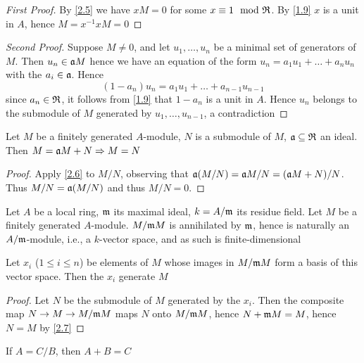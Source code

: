 \documentclass[11pt]{article}
\begin{document}
\begin{proof}[First Proof]
By \ref{2.5} we have \(xM=0\) for some \(x\equiv 1\mod{\mathfrak{R}}\). By \ref{1.9} \(x\) is a unit in \(A\), hence \(M=x^{-1}xM=0\)
\end{proof}

\begin{proof}[Second Proof]
Suppose \(M\neq 0\), and let \(u_1,\dots,u_n\) be a minimal set of generators of \(M\). Then \(u_n\in\mathfrak{a} M\)
hence we have an equation of the form \(u_n=a_1u_1+\dots+a_nu_n\) with the \(a_i\in\mathfrak{a}\). Hence
\begin{equation*}
(1-a_n)u_n=a_1u_1+\dots+a_{n-1}u_{n-1}
\end{equation*}
since \(a_n\in\mathfrak{R}\), it follows from \ref{1.9} that \(1-a_{n}\) is a unit in \(A\). Hence \(u_n\)
belongs to the submodule of \(M\) generated by \(u_1,\dots,u_{n-1}\), a contradiction
\end{proof}

\begin{corollary}[]
\label{2.7}
Let \(M\) be a finitely generated \(A\)-module, \(N\) is a submodule of \(M\), \(\mathfrak{a}\subseteq\mathfrak{R}\) an ideal.
Then \(M=\mathfrak{a} M+N\Rightarrow M=N\)
\end{corollary}

\begin{proof}
Apply \ref{2.6} to \(M/N\), observing that \(\mathfrak{a}(M/N)=\mathfrak{a} M/N=(\mathfrak{a} M+N)/N\). Thus \(M/N=\mathfrak{a}(M/N)\) and
thus \(M/N=0\).
\end{proof}

Let \(A\) be a local ring, \(\mathfrak{m}\) its maximal ideal, \(k=A/\mathfrak{m}\) its residue field. Let \(M\) be a
finitely generated \(A\)-module. \(M/\mathfrak{m} M\) is annihilated by \(\mathfrak{m}\), hence is naturally
an \(A/\mathfrak{m}\)-module, i.e., a \(k\)-vector space, and as such is finite-dimensional

\begin{proposition}[]
Let \(x_i\) (\(1\le i\le n\)) be elements of \(M\) whose images in \(M/\mathfrak{m} M\) form a basis of this
vector space. Then the \(x_i\) generate \(M\)
\end{proposition}

\begin{proof}
Let \(N\) be the submodule of \(M\) generated by the \(x_i\). Then the composite
map \(N\to M\to M/\mathfrak{m} M\) maps \(N\) onto \(M/\mathfrak{m} M\), hence \(N+\mathfrak{m} M=M\), hence \(N=M\) by \ref{2.7}
\end{proof}

If \(A=C/B\), then \(A+B=C\)
\end{document}
